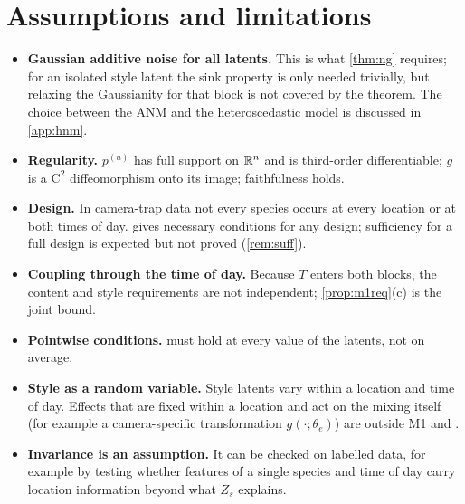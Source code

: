 \section{Assumptions and limitations}
\label{sec:limits}
\begin{itemize}[leftmargin=1.5em]
\item \textbf{Gaussian additive noise for all latents.} This is what \cref{thm:ng} requires; for an
      isolated style latent the sink property is only needed trivially, but relaxing the Gaussianity
      for that block is not covered by the theorem. The choice between the ANM and the heteroscedastic
      model is discussed in \cref{app:hnm}.
\item \textbf{Regularity.} $p^{(u)}$ has full support on $\mathbb{R}^{n}$ and is third-order differentiable;
      $g$ is a $\mathrm{C}^2$ diffeomorphism onto its image; faithfulness holds.
\item \textbf{Design.} In camera-trap data not every species occurs at every location or at both times of
      day.  gives necessary conditions for any design; sufficiency for a full design is
      expected but not proved (\cref{rem:suff}).
\item \textbf{Coupling through the time of day.} Because $T$ enters both blocks, the content and style
      requirements are not independent; \cref{prop:m1req}(c) is the joint bound.
\item \textbf{Pointwise conditions.}  must hold at every value of the latents, not on
      average.
\item \textbf{Style as a random variable.} Style latents vary within a location and time of day. Effects
	  that are fixed within a location and act on the mixing itself (for example a camera-specific
	  transformation $g(\cdot;\theta_e)$) are outside M1 and \cite{ng2025}.
\item \textbf{Invariance  is an assumption.} It can be checked on labelled data, for
      example by testing whether features of a single species and time of day carry location information
      beyond what $Z_s$ explains.
\end{itemize}

